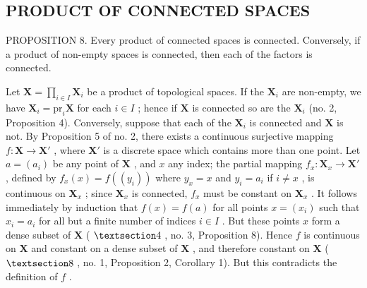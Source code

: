 \subsection{PRODUCT OF CONNECTED SPACES}

PROPOSITION 8. Every product of connected spaces is connected. Conversely, if a product of non-empty spaces is connected, then each of the factors is connected.

Let \(\mathbf{X} = \prod_{i \in I} \mathbf{X}_i\) be a product of topological spaces. If the \(\mathbf{X}_i\) are non-empty, we have \(\mathbf{X}_i = \text{pr}_i\mathbf{X}\) for each \(i \in I\) ; hence if \(\mathbf{X}\) is connected so are the \(\mathbf{X}_i\) (no. 2, Proposition 4). Conversely, suppose that each of the \(\mathbf{X}_i\) is connected and \(\mathbf{X}\) is not. By Proposition 5 of no. 2, there exists a continuous surjective mapping \(f: \mathbf{X} \to \mathbf{X}'\) , where \(\mathbf{X}'\) is a discrete space which contains more than one point. Let \(a = (a_i)\) be any point of \(\mathbf{X}\) , and \(x\) any index; the partial mapping \(f_x: \mathbf{X}_x \to \mathbf{X}'\) , defined by \(f_x(x) = f((y_i))\) where \(y_x = x\) and \(y_i = a_i\) if \(i \neq x\) , is continuous on \(\mathbf{X}_x\) ; since \(\mathbf{X}_x\) is connected, \(f_x\) must be constant on \(\mathbf{X}_x\) . It follows immediately by induction that \(f(x) = f(a)\) for all points \(x = (x_i)\) such that \(x_i = a_i\) for all but a finite number of indices \(i \in I\) . But these points \(x\) form a dense subset of \(\mathbf{X}\) ( \(\S 4\) , no. 3, Proposition 8). Hence \(f\) is continuous on \(\mathbf{X}\) and constant on a dense subset of \(\mathbf{X}\) , and therefore constant on \(\mathbf{X}\) ( \(\S 8\) , no. 1, Proposition 2, Corollary 1). But this contradicts the definition of \(f\) .

